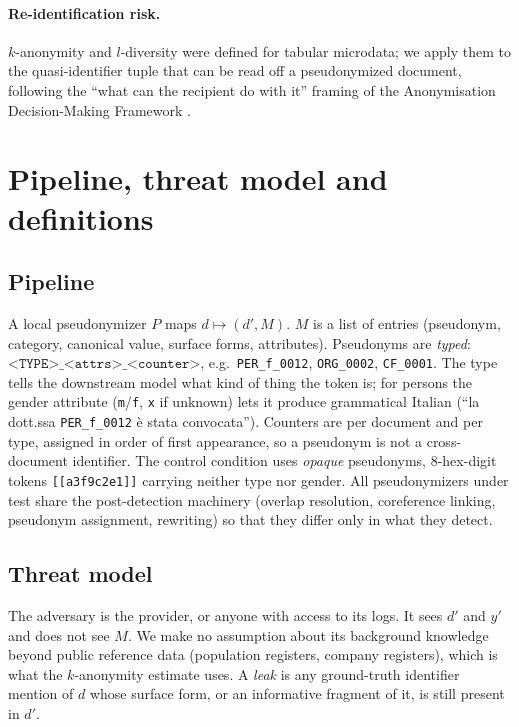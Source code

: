 \documentclass[11pt,a4paper]{article}
\newcommand{\pseud}[1]{\texttt{#1}}
\newcommand{\dprime}{d'}
\begin{document}
\paragraph{Re-identification risk.} $k$-anonymity \citep{sweeney2002} and $l$-diversity \citep{machanavajjhala2007} were defined for tabular microdata; we apply them to the quasi-identifier tuple that can be read off a pseudonymized document, following the ``what can the recipient do with it'' framing of the Anonymisation Decision-Making Framework \citep{elliot2016adf}.

\section{Pipeline, threat model and definitions}
\label{sec:defs}

\subsection{Pipeline}
A local pseudonymizer $P$ maps $d \mapsto (\dprime, M)$. $M$ is a list of entries (pseudonym, category, canonical value, surface forms, attributes). Pseudonyms are \emph{typed}: $\pseud{<TYPE>\_<attrs>\_<counter>}$, e.g.\ \pseud{PER\_f\_0012}, \pseud{ORG\_0002}, \pseud{CF\_0001}. The type tells the downstream model what kind of thing the token is; for persons the gender attribute (\pseud{m}/\pseud{f}, \pseud{x} if unknown) lets it produce grammatical Italian (``la dott.ssa \pseud{PER\_f\_0012} è stata convocata''). Counters are per document and per type, assigned in order of first appearance, so a pseudonym is not a cross-document identifier. The control condition uses \emph{opaque} pseudonyms, 8-hex-digit tokens \pseud{[[a3f9c2e1]]} carrying neither type nor gender. All pseudonymizers under test share the post-detection machinery (overlap resolution, coreference linking, pseudonym assignment, rewriting) so that they differ only in what they detect.

\subsection{Threat model}
The adversary is the provider, or anyone with access to its logs. It sees $\dprime$ and $y'$ and does not see $M$. We make no assumption about its background knowledge beyond public reference data (population registers, company registers), which is what the $k$-anonymity estimate uses. A \emph{leak} is any ground-truth identifier mention of $d$ whose surface form, or an informative fragment of it, is still present in $\dprime$.
\end{document}

